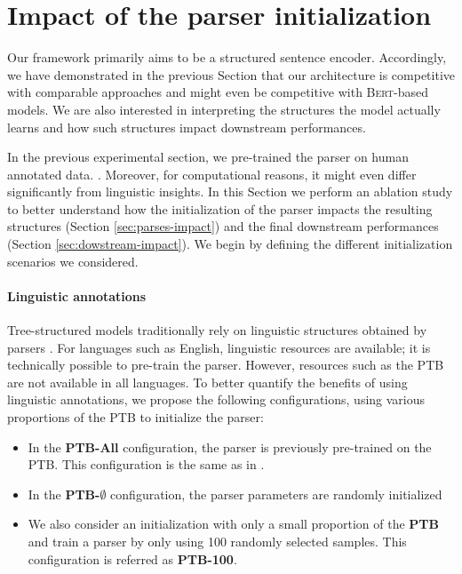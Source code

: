 
\section{Impact of the parser initialization}


Our framework primarily aims to be a structured sentence encoder. Accordingly, we have demonstrated in the previous Section that our architecture is competitive with comparable approaches and might even be competitive with \textsc{Bert}-based models. We are also interested in interpreting the structures the model actually learns and how such structures impact downstream performances.

In the previous experimental section, we pre-trained the parser on human annotated data. %
. Moreover, for computational reasons, it might even differ significantly from linguistic insights. In this Section we perform an ablation study to better understand how the initialization of the parser impacts the resulting structures (Section \ref{sec:parses-impact}) and the final downstream performances (Section \ref{sec:dowstream-impact}). We begin by defining the different initialization scenarios we considered.

\paragraph{Linguistic annotations} Tree-structured models traditionally rely on linguistic structures obtained by parsers \parencite{tai_15}. For languages such as English, linguistic resources are available; it is technically possible to pre-train the parser. However, resources such as the PTB are not available in all languages. To better quantify the benefits of using linguistic annotations, we propose the following configurations, using various proportions of the PTB to initialize the parser:

\begin{itemize}
    \item In the \textbf{PTB-All} configuration, the parser is previously pre-trained on the PTB. This configuration is the same as in .
    \item In the \textbf{PTB-$\emptyset$} configuration, the parser parameters are randomly initialized
    \item We also consider an initialization with only a small proportion of the \textbf{PTB} and train a parser by only using 100 randomly selected samples. This configuration is referred as \textbf{PTB-100}.
\end{itemize}


